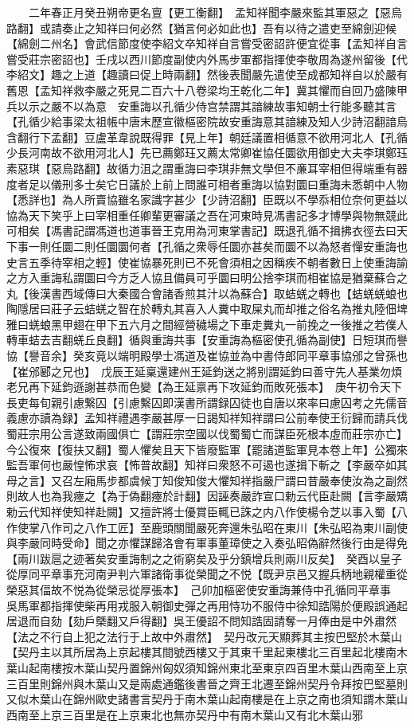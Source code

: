 　　二年春正月癸丑朔帝更名亶【更工衡翻】　孟知祥聞李嚴來監其軍惡之【惡烏路翻】或請奏止之知祥曰何必然【猶言何必如此也】吾有以待之遣吏至綿劍迎候【綿劍二州名】會武信節度使李紹文卒知祥自言嘗受密詔許便宜從事【孟知祥自言嘗受莊宗密詔也】壬戌以西川節度副使内外馬步軍都指揮使李敬周為遂州留後【代李紹文】趣之上道【趣讀曰促上時兩翻】然後表聞嚴先遣使至成都知祥自以於嚴有舊恩【孟知祥救李嚴之死見二百六十八卷梁均王乾化二年】冀其懼而自回乃盛陳甲兵以示之嚴不以為意　安重誨以孔循少侍宫禁謂其諳練故事知朝士行能多聽其言【孔循少給事梁太祖帳中唐末歷宣徽樞密院故安重誨意其諳練及知人少詩沼翻諳烏含翻行下孟翻】豆盧革韋說既得罪【見上年】朝廷議置相循意不欲用河北人【孔循少長河南故不欲用河北人】先已薦鄭珏又薦太常卿崔協任圜欲用御史大夫李琪鄭珏素惡琪【惡烏路翻】故循力沮之謂重誨曰李琪非無文學但不亷耳宰相但得端重有器度者足以儀刑多士矣它日議於上前上問誰可相者重誨以協對圜曰重誨未悉朝中人物【悉詳也】為人所賣協雖名家識字甚少【少詩沼翻】臣既以不學忝相位奈何更益以協為天下笑乎上曰宰相重任卿輩更審議之吾在河東時見馮書記多才博學與物無競此可相矣【馮書記謂馮道也道事晉王克用為河東掌書記】既退孔循不揖拂衣徑去曰天下事一則任圜二則任圜圜何者【孔循之衆辱任圜亦甚矣而圜不以為怒者憚安重誨也史言五季待宰相之輕】使崔協暴死則已不死會須相之因稱疾不朝者數日上使重誨諭之方入重誨私謂圜曰今方乏人協且備員可乎圜曰明公捨李琪而相崔協是猶棄蘇合之丸【後漢書西域傳曰大秦國合會諸香煎其汁以為蘇合】取蛣蜣之轉也【蛣蜣蜣蜋也陶隱居曰莊子云蛣蜣之智在於轉丸其喜入人糞中取屎丸而却推之俗名為推丸陸佃埤雅曰蜣蜋黑甲翅在甲下五六月之間經營穢場之下車走糞丸一前挽之一後推之若僕人轉車蛣去吉翻蜣丘良翻】循與重誨共事【安重誨為樞密使孔循為副使】日短琪而譽協【譽音余】癸亥竟以端明殿學士馮道及崔協並為中書侍郎同平章事協邠之曾孫也【崔邠郾之兄也】　戊辰王延稟還建州王延鈞送之將别謂延鈞曰善守先人基業勿煩老兄再下延鈞遜謝甚恭而色變【為王延禀再下攻延鈞而敗死張本】　庚午初令天下長吏每旬親引慮繋囚【引慮繫囚即漢書所謂録囚徒也自唐以來率曰慮囚考之先儒音義慮亦讀為録】孟知祥禮遇李嚴甚厚一日謁知祥知祥謂曰公前奉使王衍歸而請兵伐蜀莊宗用公言遂致兩國俱亡【謂莊宗空國以伐蜀蜀亡而謀臣死根本虛而莊宗亦亡】今公復來【復扶又翻】蜀人懼矣且天下皆廢監軍【罷諸道監軍見本卷上年】公獨來監吾軍何也嚴惶怖求哀【怖普故翻】知祥曰衆怒不可遏也遂揖下斬之【李嚴卒如其母之言】又召左廂馬步都虞候丁知俊知俊大懼知祥指嚴尸謂曰昔嚴奉使汝為之副然則故人也為我瘞之【為于偽翻瘞於計翻】因誣奏嚴詐宣口勅云代臣赴闕【言李嚴矯勅云代知祥使知祥赴闕】又擅許將士優賞臣輒已誅之内八作使楊令芝以事入蜀【八作使掌八作司之八作工匠】至鹿頭關聞嚴死奔還朱弘昭在東川【朱弘昭為東川副使與李嚴同時受命】聞之亦懼謀歸洛會有軍事董璋使之入奏弘昭偽辭然後行由是得免【兩川跋扈之迹著矣安重誨制之之術窮矣及乎分鎮增兵則兩川反矣】　癸酉以皇子從厚同平章事充河南尹判六軍諸衛事從榮聞之不悦【既尹京邑又握兵柄地親權重從榮惡其偪故不悦為從榮忌從厚張本】　己卯加樞密使安重誨兼侍中孔循同平章事　吳馬軍都指揮使柴再用戎服入朝御史彈之再用恃功不服侍中徐知誥陽於便殿誤通起居退而自劾【劾戶槩翻又戶得翻】吳王優詔不問知誥固請奪一月俸由是中外肅然【法之不行自上犯之法行于上故中外肅然】　契丹改元天顯葬其主按巴堅於木葉山【契丹主以其所居為上京起樓其間號西樓又于其東千里起東樓北三百里起北樓南木葉山起南樓按木葉山契丹置錦州匈奴須知錦州東北至東京四百里木葉山西南至上京三百里則錦州與木葉山又是兩處通鑑後書晉之齊王北遷至錦州契丹令拜按巴堅墓則又似木葉山在錦州歐史諸書言契丹于南木葉山起南樓是在上京之南也須知謂木葉山西南至上京三百里是在上京東北也無亦契丹中有南木葉山又有北木葉山邪